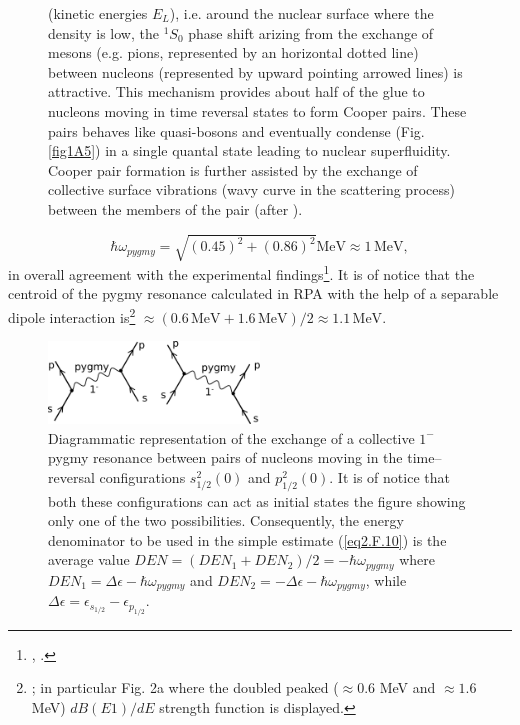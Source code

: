 \begin{figure}
{    (kinetic energies $E_L$), i.e. around the nuclear surface where the density is low, the $^1S_0$ phase shift arizing from the exchange of mesons (e.g. pions, represented by an horizontal dotted  line) between nucleons (represented by upward pointing arrowed lines)
    is attractive. This mechanism provides about half of the glue to nucleons moving in time reversal states to form Cooper pairs. These
    pairs behaves like quasi-bosons and eventually condense (Fig. \ref{fig1A5}) in a single quantal state leading to nuclear superfluidity. Cooper pair formation is
    further assisted by the exchange of collective surface vibrations (wavy curve in the scattering process) between the members of the
    pair (after \cite{Broglia:02d}).}\label{fig1F1}
  \end{figure}
\begin{equation}
\hbar \omega_{pygmy}=\sqrt{(0.45)^2+(0.86)^2}\text{MeV}\approx 1\, \text{MeV},
\end{equation}  
 in overall agreement with the experimental findings\footnote{\cite{Zinser:97}, \cite{Kanungo:15}.}. It is of notice that the centroid of the pygmy resonance calculated in  RPA with the help of a separable dipole interaction is\footnote{\cite{Barranco:01}; in particular  Fig. 2a where the doubled peaked ($\approx0.6$ MeV and $\approx1.6$ MeV) $dB(E1)/dE$ strength function is displayed.} $\approx (0.6\,\text{MeV}+ 1.6\, \text{MeV})/2\approx 1.1\, \text{MeV}$.
 \begin{figure}
 \centerline{\includegraphics*[width=0.5\textwidth,angle=0]{nutshell/figs/pigmy.pdf}}
 \caption{Diagrammatic representation of the exchange of a collective $1^-$ pygmy resonance between pairs of nucleons moving in the time--reversal configurations $s_{1/2}^2(0)$ and $p_{1/2}^2(0)$. It is of notice that both these configurations can act as initial states  the figure showing only one of the two possibilities. Consequently, the energy denominator to be used in the simple estimate (\ref{eq2.F.10}) is the average value $DEN=(DEN_1+DEN_2)/2=-\hbar\omega_{pygmy}$ where $DEN_1=\Delta \epsilon-\hbar\omega_{pygmy}$ and $DEN_2=-\Delta\epsilon-\hbar\omega_{pygmy}$, while $\Delta\epsilon=\epsilon_{s_{1/2}}-\epsilon_{p_{1/2}}$.}\label{pigmy}
 \end{figure}

